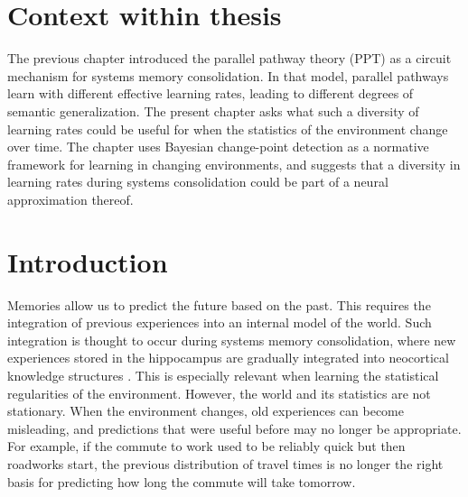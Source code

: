 

\section{Context within thesis}

The previous chapter introduced the parallel pathway theory (PPT) as a circuit mechanism for systems memory consolidation. In that model, parallel pathways learn with different effective learning rates, leading to different degrees of semantic generalization. The present chapter asks what such a diversity of learning rates could be useful for when the statistics of the environment change over time. The chapter uses Bayesian change-point detection as a normative framework for learning in changing environments, and suggests that a diversity in learning rates during systems consolidation could be part of a neural approximation thereof.

\section{Introduction}


Memories allow us to predict the future based on the past. This requires the integration of previous experiences into an internal model of the world. Such integration is thought to occur during systems memory consolidation, where new experiences stored in the hippocampus are gradually integrated into neocortical knowledge structures \citep{McClelland1995}. This is especially relevant when learning the statistical regularities of the environment. However, the world and its statistics are not stationary. When the environment changes, old experiences can become misleading, and predictions that were useful before may no longer be appropriate. For example, if the commute to work used to be reliably quick but then roadworks start, the previous distribution of travel times is no longer the right basis for predicting how long the commute will take tomorrow.

